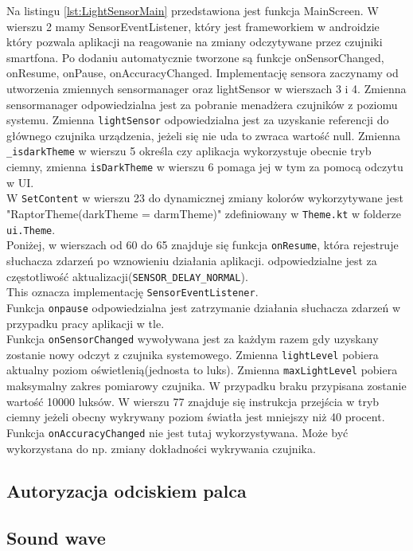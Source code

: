 Na listingu \ref{lst:LightSensorMain} przedstawiona jest funkcja MainScreen. W wierszu 2 mamy SensorEventListener, który jest frameworkiem w androidzie który pozwala aplikacji na reagowanie na zmiany odczytywane przez czujniki smartfona. Po dodaniu automatycznie tworzone są funkcje onSensorChanged, onResume, onPause, onAccuracyChanged.
Implementację sensora zaczynamy od utworzenia zmiennych sensormanager oraz lightSensor w wierszach 3 i 4. Zmienna sensormanager odpowiedzialna jest za pobranie menadżera czujników z poziomu systemu.
Zmienna \texttt{lightSensor} odpowiedzialna jest za uzyskanie referencji do głównego czujnika urządzenia, jeżeli się nie uda to zwraca wartość null.
Zmienna \texttt{\_isdarkTheme} w wierszu 5 określa czy aplikacja wykorzystuje obecnie tryb ciemny, zmienna \texttt{isDarkTheme} w wierszu 6 pomaga jej w tym za pomocą odczytu w UI.
\\
W \texttt{SetContent} w wierszu 23 do dynamicznej zmiany kolorów wykorzytywane jest "RaptorTheme(darkTheme = darmTheme)" zdefiniowany w \texttt{Theme.kt} w folderze \texttt{ui.Theme}.
\\
Poniżej, w wierszach od 60 do 65 znajduje się funkcja \texttt{onResume}, która rejestruje słuchacza zdarzeń po wznowieniu działania aplikacji. odpowiedzialne jest za częstotliwość aktualizacji(\texttt{SENSOR\_DELAY\_NORMAL}).
\\
This oznacza implementację \texttt{SensorEventListener}.
\\
Funkcja \texttt{onpause} odpowiedzialna jest zatrzymanie działania słuchacza zdarzeń w przypadku pracy aplikacji w tle.
\\
Funkcja \texttt{onSensorChanged} wywoływana jest za każdym razem gdy uzyskany zostanie nowy odczyt z czujnika systemowego.
Zmienna \texttt{lightLevel} pobiera aktualny poziom oświetlenią(jednosta to luks).
Zmienna \texttt{maxLightLevel} pobiera maksymalny zakres pomiarowy czujnika. W przypadku braku przypisana zostanie wartość 10000 luksów. 
W wierszu 77 znajduje się instrukcja przejścia w tryb ciemny jeżeli obecny wykrywany poziom światła jest mniejszy niż 40 procent.
Funkcja \texttt{onAccuracyChanged} nie jest tutaj wykorzystywana. Może być wykorzystana do np. zmiany dokładności wykrywania czujnika.
\\


\subsection{Autoryzacja odciskiem palca}

\subsection{Sound wave}
